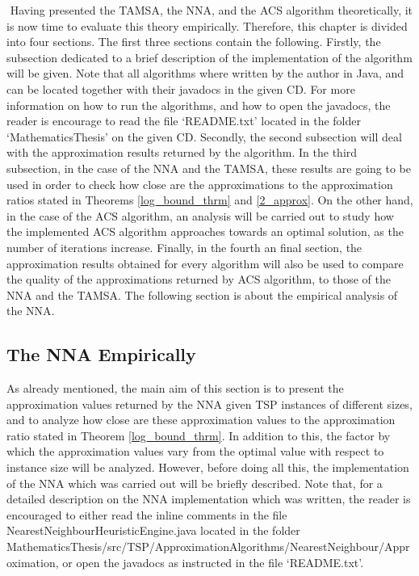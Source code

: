 \documentclass[12pt]{article}
\numberwithin{equation}{subsection}
\numberwithin{table}{subsection}
\numberwithin{algorithm}{subsection}
\numberwithin{figure}{subsection}
\begin{document}
$$\newpage 
{}
Having presented the TAMSA, the NNA, and the ACS algorithm theoretically, it is now time to evaluate this theory empirically. Therefore, this chapter is divided into four sections. The first three sections contain the following. Firstly, the subsection dedicated to a brief description of the implementation of the algorithm will be given. Note that all algorithms where written by the author in Java, and can be located together with their javadocs in the given CD. For more information on how to run the algorithms, and how to open the javadocs, the reader is encourage to read the file `README.txt' located in the folder `MathematicsThesis' on the given CD. Secondly, the second subsection will deal with the approximation results returned by the algorithm. In the third subsection, in the case of the NNA and the TAMSA, these results are going to be used in order to check how close are the approximations to the approximation ratios stated in Theorems \ref{log_bound_thrm} and \ref{2_approx}. On the other hand, in the case of the ACS algorithm, an analysis will be carried out to study how the implemented ACS algorithm approaches towards an optimal solution, as the number of iterations increase. Finally, in the fourth an final section, the approximation results obtained for every algorithm will also be used to compare the quality of the approximations returned by ACS algorithm, to those of the NNA and the TAMSA. The following section is about the empirical analysis of the NNA. 
\subsection{The NNA Empirically}
As already mentioned, the main aim of this section is to present the approximation values returned by the NNA given TSP instances of different sizes, and to analyze how close are these approximation values to the approximation ratio stated in Theorem \ref{log_bound_thrm}. In addition to this, the factor by which the approximation values vary from the optimal value with respect to instance size will be analyzed. However, before doing all this, the implementation of the NNA which was carried out will be briefly described. Note that, for a detailed description on the NNA implementation which was written, the reader is encouraged to either read the inline comments in the file NearestNeighbourHeuristicEngine.java located in the folder MathematicsThesis/src/TSP/ApproximationAlgorithms/NearestNeighbour/Approximation, or open the javadocs as instructed in the file `README.txt'.
\end{document}
